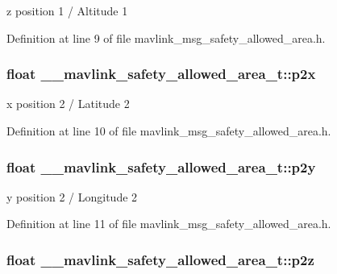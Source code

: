 z position 1 / Altitude 1 



Definition at line 9 of file mavlink\-\_\-msg\-\_\-safety\-\_\-allowed\-\_\-area.\-h.

\hypertarget{struct____mavlink__safety__allowed__area__t_a6a558f454d61143884a162cf3710308e}{
\subsubsection[{p2x}]{\setlength{\rightskip}{0pt plus 5cm}float \-\_\-\-\_\-mavlink\-\_\-safety\-\_\-allowed\-\_\-area\-\_\-t\-::p2x}}\label{struct____mavlink__safety__allowed__area__t_a6a558f454d61143884a162cf3710308e}


x position 2 / Latitude 2 



Definition at line 10 of file mavlink\-\_\-msg\-\_\-safety\-\_\-allowed\-\_\-area.\-h.

\hypertarget{struct____mavlink__safety__allowed__area__t_a4e149f8f37b1d5987602ac3e49a65a66}{
\subsubsection[{p2y}]{\setlength{\rightskip}{0pt plus 5cm}float \-\_\-\-\_\-mavlink\-\_\-safety\-\_\-allowed\-\_\-area\-\_\-t\-::p2y}}\label{struct____mavlink__safety__allowed__area__t_a4e149f8f37b1d5987602ac3e49a65a66}


y position 2 / Longitude 2 



Definition at line 11 of file mavlink\-\_\-msg\-\_\-safety\-\_\-allowed\-\_\-area.\-h.

\hypertarget{struct____mavlink__safety__allowed__area__t_a9af8420ae1c69890ec5dfafd54785d91}{
\subsubsection[{p2z}]{\setlength{\rightskip}{0pt plus 5cm}float \-\_\-\-\_\-mavlink\-\_\-safety\-\_\-allowed\-\_\-area\-\_\-t\-::p2z}}\label{struct____mavlink__safety__allowed__area__t_a9af8420ae1c69890ec5dfafd54785d91}


